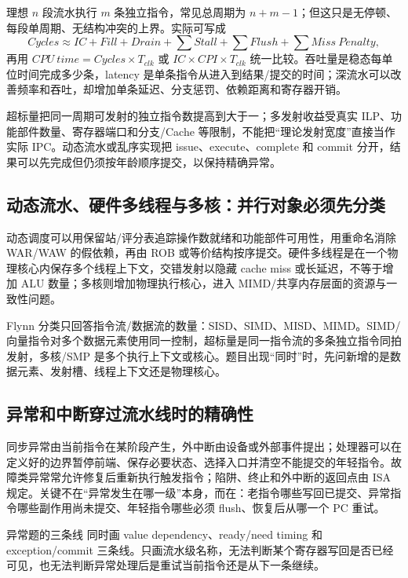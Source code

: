 \documentclass[UTF8,fontset=fandol,11pt,a4paper]{ctexart}
\begin{document}
理想 $n$ 段流水执行 $m$ 条独立指令，常见总周期为 $n+m-1$；但这只是无停顿、每段单周期、无结构冲突的上界。实际可写成
\[
Cycles\approx IC+Fill+Drain+\sum Stall+\sum Flush+\sum Miss\ Penalty,
\]
再用 $CPU\ time=Cycles\times T_{clk}$ 或 $IC\times CPI\times T_{clk}$ 统一比较。吞吐量是稳态每单位时间完成多少条，latency 是单条指令从进入到结果/提交的时间；深流水可以改善频率和吞吐，却增加单条延迟、分支惩罚、依赖距离和寄存器开销。

超标量把同一周期可发射的独立指令数提高到大于一；多发射收益受真实 ILP、功能部件数量、寄存器端口和分支/Cache 等限制，不能把“理论发射宽度”直接当作实际 IPC。动态流水或乱序实现把 issue、execute、complete 和 commit 分开，结果可以先完成但仍须按年龄顺序提交，以保持精确异常。

\subsection{动态流水、硬件多线程与多核：并行对象必须先分类}

动态调度可以用保留站/评分表追踪操作数就绪和功能部件可用性，用重命名消除 WAR/WAW 的假依赖，再由 ROB 或等价结构按序提交。硬件多线程是在一个物理核心内保存多个线程上下文，交错发射以隐藏 cache miss 或长延迟，不等于增加 ALU 数量；多核则增加物理执行核心，进入 MIMD/共享内存层面的资源与一致性问题。

Flynn 分类只回答指令流/数据流的数量：SISD、SIMD、MISD、MIMD。SIMD/向量指令对多个数据元素使用同一控制，超标量是同一指令流的多条独立指令同拍发射，多核/SMP 是多个执行上下文或核心。题目出现“同时”时，先问新增的是数据元素、发射槽、线程上下文还是物理核心。

\subsection{异常和中断穿过流水线时的精确性}

同步异常由当前指令在某阶段产生，外中断由设备或外部事件提出；处理器可以在定义好的边界暂停前端、保存必要状态、选择入口并清空不能提交的年轻指令。故障类异常常允许修复后重新执行触发指令；陷阱、终止和外中断的返回点由 ISA 规定。关键不在“异常发生在哪一级”本身，而在：老指令哪些写回已提交、异常指令哪些副作用尚未提交、年轻指令哪些必须 flush、恢复后从哪一个 PC 重试。

\begin{methodbox}{异常题的三条线}
同时画 value dependency、ready/need timing 和 exception/commit 三条线。只画流水级名称，无法判断某个寄存器写回是否已经可见，也无法判断异常处理后是重试当前指令还是从下一条继续。
\end{methodbox}
\end{document}
